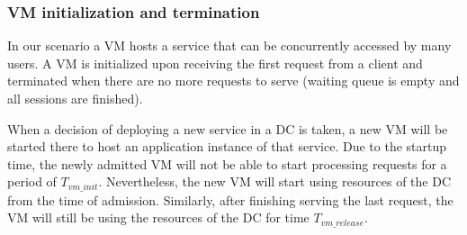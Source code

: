 \subsubsection{VM initialization and termination}
In our scenario a VM hosts a service that can be concurrently accessed by many users.
A VM is initialized upon receiving the first request from a client and terminated when there are no more requests to serve (waiting queue is empty and all sessions are finished).

When a decision of deploying a new service in a \ac{DC} is taken, a new VM will be started there to host an application instance of that service.
Due to the startup time, the newly admitted VM will not be able to start processing requests for a period of $T_{vm\_init}$. 
Nevertheless, the new VM will start using resources of the \ac{DC} from the time of admission.
Similarly, after finishing serving the last request, the VM will still be using the resources of the \ac{DC} for time $T_{vm\_release}$.


